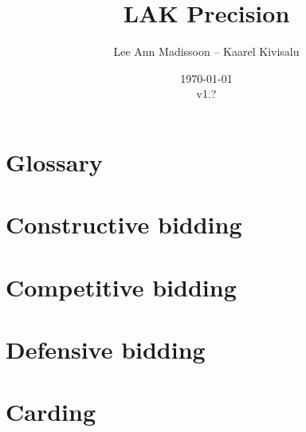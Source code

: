 \documentclass[11pt]{report}
\title{LAK Precision}
\author{Lee Ann Madissoon -- Kaarel Kivisalu}
\date{\today\\v1.?}
\begin{document}
\maketitle
\tableofcontents


\chapter*{Glossary}


\chapter{Constructive bidding}



% 
% 











\chapter{Competitive bidding}


\chapter{Defensive bidding}


\chapter{Carding}

\end{document}
